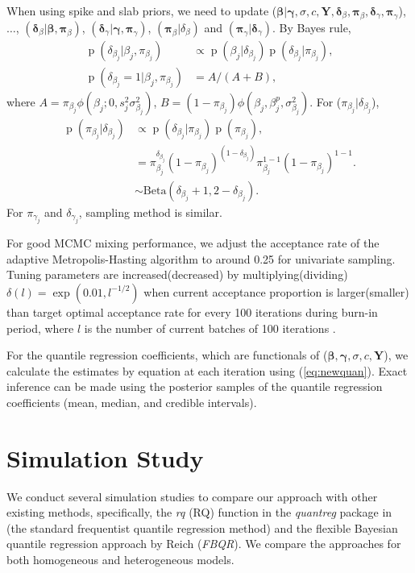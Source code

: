 \documentclass[12pt]{article}
\DeclareMathOperator{\pr}{p}
\begin{document}
When using spike and slab priors, we need to update ($\bm \beta|\bm
\gamma, \sigma, c, \bm Y, \bm \delta_{\beta}, \bm \pi_{\beta}, \bm
\delta_{\gamma}, \bm \pi_{\gamma}$), $\ldots$, $(\bm \delta_{\beta}|\bm
\beta, \bm \pi_{\beta})$, $(\bm \delta_{\gamma}|\bm \gamma, \bm
\pi_{\gamma})$, $(\bm \pi_{\beta}|\delta_{\beta})$ and $(\bm
\pi_{\gamma}|\bm \delta_{\gamma})$.  By Bayes rule,
\begin{align*}
  \pr(\delta_{\beta_j}|\beta_j, \pi_{\beta_j}) & \propto \pr(\beta_j |
  \delta_{\beta_j})
  \pr(\delta_{\beta_j}|\pi_{\beta_j}) ,\\
  \pr(\delta_{\beta_j} = 1|\beta_j, \pi_{\beta_j})& = A/(A + B),
\end{align*}
where $A = \pi_{\beta_j}\phi (\beta_j;0, s_j^2\sigma_{\beta_j}^2)$, $B
= (1-\pi_{\beta_j})\phi(\beta_j, \beta_j^p, \sigma_{\beta_j}^2)$.  For
($\pi_{\beta_j}|\delta_{\beta_j}$),
\begin{align*}
  \pr(\pi_{\beta_j}| \delta_{\beta_j}) & \propto \pr(\delta_{\beta_j}|\pi_{\beta_j}) \pr(\pi_{\beta_j}) ,\\
  & = \pi_{\beta_j}^{\delta_{\beta_j}} (1 - \pi_{\beta_j})^{(1 - \delta_{\beta_j})} \pi_{\beta_j}^{1 - 1}(1 - \pi_{\beta_j})^{1-1}.\\
  & \sim \mbox{Beta}(\delta_{\beta_j} + 1, 2 - \delta_{\beta_j}).
\end{align*}
For $\pi_{\gamma_j}$ and $\delta_{\gamma_j}$, sampling method is
similar.


For good MCMC mixing performance, we adjust the acceptance rate of the
adaptive Metropolis-Hasting algorithm to around 0.25 for univariate
sampling. Tuning parameters are increased(decreased) by
multiplying(dividing) $\delta(l) = \exp(0.01, l^{-1/2})$ when current
acceptance proportion is larger(smaller) than target optimal
acceptance rate for every 100 iterations during burn-in period, where
$l$ is the number of current batches of 100 iterations \citep{jara2009}.

For the quantile regression coefficients, which are functionals of
($\bm \beta, \bm \gamma, \sigma, c, \bm Y$), we calculate the
estimates by equation at each iteration using
(\ref{eq:newquan}). Exact inference can be made using the posterior
samples of the quantile regression coefficients (mean, median, and
credible intervals).

\section{Simulation Study}
\label{sec:simulations}
We conduct several simulation studies to compare our approach with
other existing methods, specifically, the \textit{rq} (RQ) function in the
\textit{quantreg} package \citep{quantreg} in \cite{R} (the standard
frequentist quantile regression method) and the flexible Bayesian
quantile regression approach by Reich (\textit{FBQR}).  We compare the
approaches for both homogeneous and heterogeneous models.
\end{document}
